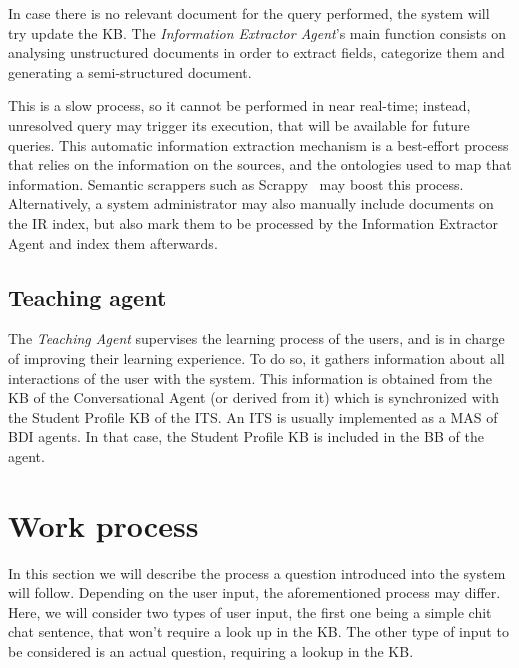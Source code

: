 In case there is no relevant document for the query performed, the system will try update the KB. The {\em Information Extractor Agent}'s main function consists on analysing unstructured documents in order to extract fields, categorize them and generating a semi-structured document. 

This is a slow process, so it cannot be performed in near real-time; instead, unresolved query may trigger its execution, that will be available for future queries. 
This automatic information extraction mechanism is a best-effort process that relies on the information on the sources, and the ontologies used to map that information. Semantic scrappers such as Scrappy~\cite{villamor13} may boost this process.
Alternatively, a system administrator may also manually include documents on the \ac{IR} index, but also mark them to be processed by the Information Extractor Agent and index them afterwards.

\subsection{Teaching agent}

The {\em Teaching Agent} supervises the learning process of the users, and is in charge of improving their learning experience.
To do so, it  gathers information about all interactions of the user with the system. This information is obtained from the \ac{KB} of the Conversational Agent (or derived from it) which is synchronized with the Student Profile KB of the \ac{ITS}.
An \ac{ITS} is usually implemented as a \ac{MAS} of \ac{BDI} agents. In that case, the Student Profile KB is included in the \ac{BB} of the agent. 

%
\section{Work process} %

In this section we will describe the process a question introduced into the system will follow. Depending on the user input, the aforementioned process may differ. Here, we will consider two types of user input, the first one being a simple chit chat sentence, that won't require a look up in the \ac{KB}. The other type of input to be considered is an actual question, requiring a lookup in the \ac{KB}.

